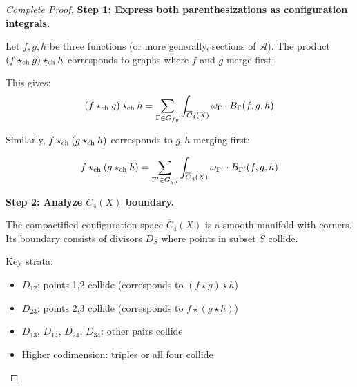 \begin{proof}[Complete Proof]
\textbf{Step 1: Express both parenthesizations as configuration integrals.}

Let $f, g, h$ be three functions (or more generally, sections of $\mathcal{A}$). The product $(f \star_{\text{ch}} g) \star_{\text{ch}} h$ corresponds to graphs where $f$ and $g$ merge first:

\begin{center}
\end{center}

This gives:
$$(f \star_{\text{ch}} g) \star_{\text{ch}} h = \sum_{\Gamma \in G_{fg}} \int_{\overline{C}_{4}(X)} \omega_\Gamma \cdot B_\Gamma(f,g,h)$$

Similarly, $f \star_{\text{ch}} (g \star_{\text{ch}} h)$ corresponds to $g,h$ merging first:
\begin{center}
\end{center}

$$f \star_{\text{ch}} (g \star_{\text{ch}} h) = \sum_{\Gamma' \in G_{gh}} \int_{\overline{C}_{4}(X)} \omega_{\Gamma'} \cdot B_{\Gamma'}(f,g,h)$$

\textbf{Step 2: Analyze $\overline{C}_4(X)$ boundary.}

The compactified configuration space $\overline{C}_4(X)$ is a smooth manifold with corners. Its boundary consists of divisors $D_S$ where points in subset $S$ collide.

Key strata:
\begin{itemize}
\item $D_{12}$: points 1,2 collide (corresponds to $(f \star g) \star h$)
\item $D_{23}$: points 2,3 collide (corresponds to $f \star (g \star h)$)
\item $D_{13}$, $D_{14}$, $D_{24}$, $D_{34}$: other pairs collide
\item Higher codimension: triples or all four collide
\end{itemize}


\end{proof}
